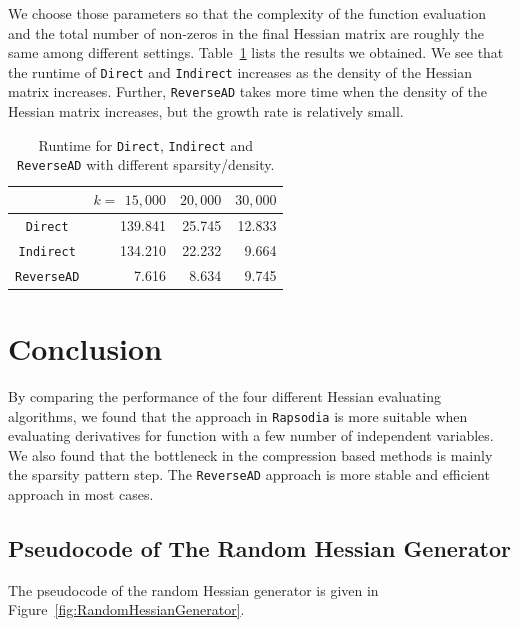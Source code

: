 \documentclass[11pt, twocolumn]{article}
\begin{document}
We choose those parameters so that the complexity of the function evaluation and the total number of non-zeros in the final Hessian matrix are roughly the same among different settings. 
Table~\ref{tab:sparsity} lists the results we obtained.
We see that the runtime of {\tt Direct} and {\tt Indirect} increases as the density of the Hessian matrix increases. Further, {\tt ReverseAD} takes more time when the density of the Hessian matrix increases, but the growth rate is relatively small.
\begin{table}[htbp]
\begin{center}
\begin{tabular}{ | c | r | r | r |}
\hline
& $k=$ $15,000$ & $20,000$ & $30,000$\\
\hline
{\tt Direct} & 139.841 & 25.745 & 12.833\\
{\tt Indirect} & 134.210 & 22.232 & 9.664 \\
{\tt ReverseAD} & 7.616 & 8.634 & 9.745\\
\hline 
\end{tabular}
\caption{Runtime for {\tt Direct}, {\tt Indirect} and {\tt ReverseAD} with different sparsity/density.}
\label{tab:sparsity}
\end{center}
\end{table}

\section*{Conclusion}
By comparing the performance of the four different Hessian evaluating algorithms, we found that the approach in {\tt Rapsodia} is more suitable when evaluating derivatives for function with a few number of independent variables. We also found that the bottleneck in the compression based methods is mainly the sparsity pattern step. 
The {\tt ReverseAD} approach is more stable and efficient approach in most cases. 

\newpage
\appendix
\subsection{Pseudocode of The Random Hessian Generator}
\label{sec-random-code}

The pseudocode of the random Hessian generator is given in Figure~\ref{fig:RandomHessianGenerator}.
\end{document}
